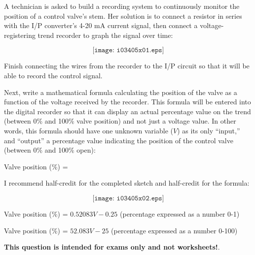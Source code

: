 

A technician is asked to build a recording system to continuously monitor the position of a control valve's stem.  Her solution is to connect a resistor in series with the I/P converter's 4-20 mA current signal, then connect a voltage-registering trend recorder to graph the signal over time:

$$\texttt{[image: i03405x01.eps]}$$

Finish connecting the wires from the recorder to the I/P circuit so that it will be able to record the control signal.

Next, write a mathematical formula calculating the position of the valve as a function of the voltage received by the recorder.  This formula will be entered into the digital recorder so that it can display an actual percentage value on the trend (between 0\% and 100\% valve position) and not just a voltage value.  In other words, this formula should have one unknown variable ($V$) as its only ``input,'' and ``output'' a percentage value indicating the position of the control valve (between 0\% and 100\% open):

\vskip 20pt

Valve position (\%) = 







I recommend half-credit for the completed sketch and half-credit for the formula:

$$\texttt{[image: i03405x02.eps]}$$

\vskip 10pt

Valve position (\%) = $0.52083 V - 0.25$ (percentage expressed as a number 0-1)

Valve position (\%) = $52.083 V - 25$ (percentage expressed as a number 0-100) 







{\bf This question is intended for exams only and not worksheets!}.



